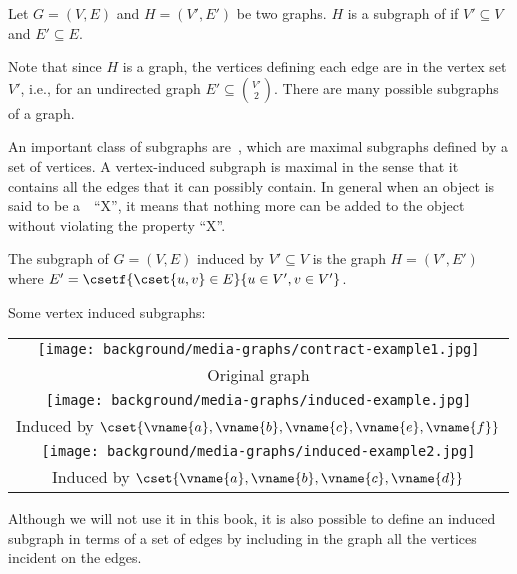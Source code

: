 \begin{definition}[Subgraph]
\label{def:bg::graphs::subgraph}
Let $G = (V,E)$ and $H = (V', E')$ be two graphs.  $H$ is a
subgraph of if $V' \subseteq V$ and $E' \subseteq E$.
\end{definition}

\begin{note}
Note that since $H$ is a graph, the vertices defining each edge are in
the vertex set $V'$, i.e., for an undirected graph $E' \subseteq
\binom{V'}{2}$.  There are many possible subgraphs of a graph.
\end{note}

\begin{gram}
An important class of subgraphs are~,
which are maximal subgraphs defined by a set of vertices.
%
A vertex-induced subgraph is maximal in the sense that it contains all
the edges that it can possibly contain.
%
In general when an object is said to be a~~``X'', it
means that nothing more can be added to the object without violating
the property ``X''.
\end{gram}

\begin{definition}
\label{def:bg::graphs::subgraph::vi}
The subgraph of $G = (V,E)$ induced by $V' \subseteq V$ is the graph $H
= (V',E')$ where $E' = \csetf{\cset{u,v} \in E}{u \in V', v \in V'}$.
\end{definition}


\begin{example}
Some vertex induced subgraphs:
\begin{center}
\begin{tabular}{c}
\texttt{[image: background/media-graphs/contract-example1.jpg]}
\\
Original graph 
\\
\texttt{[image: background/media-graphs/induced-example.jpg]}
\\
 Induced by
$\cset{\vname{a},\vname{b},\vname{c},\vname{e},\vname{f}}$ 
\\
\texttt{[image: background/media-graphs/induced-example2.jpg]}
\\
Induced by $\cset{\vname{a},\vname{b},\vname{c},\vname{d}}$
\end{tabular}
\end{center}
\end{example}

\begin{gram}
Although we will not use it in this book, it is also possible to
define an induced subgraph in terms of a set of edges by including in
the graph all the vertices incident on the edges.
\end{gram}

